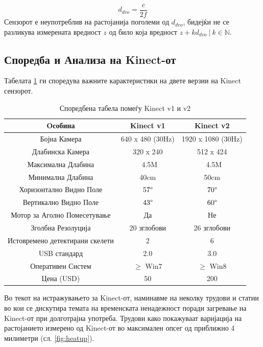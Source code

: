 \documentclass[11pt]{article}
\begin{document}
		    \begin{equation}
          d_{dvo} = \frac{c}{2f}
        \end{equation}
		    Сензорот е неупотреблив на растојанија поголеми од $d_{dvo}$, бидејќи не се разликува измерената вредност $z$ од било која вредност $z + k d_{dvo}\ | \ k \in \mathbb{N}$.

  \subsection{Споредба и Анализа на Kinect-от}
    Табелата \ref{tab:comparison} ги споредува важните карактеристики на двете верзии на Kinect сензорот.
    \begin{table}[H]
      \centering
      \label{tab:comparison}
      \caption{Споредбена табела помеѓу Kinect v1 и v2}
      \begin{tabular}{||c|c|c||}
        \hline
        \textbf{Oсобина} & \textbf{Kinect v1} & \textbf{Kinect v2} \\
        \hline
        Бојна Камера & 640 x 480 (30Hz) & 1920 x 1080 (30Hz) \\
        \hline
        Длабинска Камера & 320 x 240 & 512 x 424 \\
        \hline
        Максимална Длабина & ~4.5M & ~4.5M \\
        \hline
        Минимална Длабина & 40cm & 50cm \\
        \hline
        Хоризонтално Видно Поле & $57\degree$ & $70\degree$ \\
        \hline
        Вертикално Видно Поле & $43\degree$ & $60\degree$ \\
        \hline
        Мотор за Аголно Помесетување & Да & Не \\
        \hline
        Зголбна Резолуција & 20 зглобови & 26 зглобови \\
        \hline
        Истовремено детектирани скелети &  2 & 6 \\
        \hline
        USB стандард & 2.0 & 3.0 \\
        \hline
        Оперативен Систем & $\geq$ Win7 & $\geq$ Win8 \\
        \hline
        Цена (USD) & 50 & 200 \\
        \hline
      \end{tabular}
      \end{table}

    Во текот на истражувањето за Kinect-от, наминавме на неколку трудови и статии во кои се дискутира темата на временската ненадежност поради загревање на Kinect-от при долготрајна употреба. Трудови како \cite{heatup} покажуваат варијација на растојанието измерено од Kinect-от во максимален опсег од приближно 4 милиметри (сл. \ref{fig:heatup}).
\end{document}
